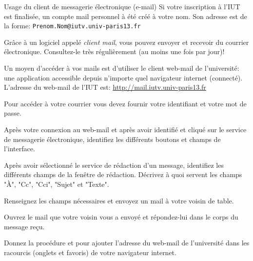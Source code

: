 \begin{exercice}
  \begin{exercicelet}{Usage du client de messagerie électronique
      (e-mail)}
    Si votre inscription à l'IUT est finalisée, un compte mail personnel
    à été créé à votre nom. Son adresse est de la forme:
    \texttt{Prenom.Nom@iutv.univ-paris13.fr}

    Grâce à un logiciel appelé \emph{client mail}, vous pouvez envoyer
    et recevoir du courrier électronique. Consultez-le très
    régulièrement (au moins une fois par jour)!

    Un moyen d'accéder à vos mails est d'utiliser le client web-mail de
    l'université: une application accessible depuis n'importe quel
    navigateur internet (connecté).  L'adresse du web-mail de l'IUT est:
    \url{http://mail.iutv.univ-paris13.fr}

    Pour accéder à votre courrier vous devez fournir votre identifiant
    et votre mot de passe.

    \begin{questions}
    \item Après votre connexion au web-mail et après avoir identifié et
      cliqué sur le service de messagerie électronique, identifiez les
      différents boutons et champs de l'interface.
    \item Après avoir sélectionné le service de rédaction d'un message,
      identifiez les différents champs de la fenêtre de
      rédaction. Décrivez à quoi servent les champs "À", "Cc", "Cci",
      "Sujet" et "Texte".
    \item Renseignez les champs nécessaires et envoyez un mail à votre
      voisin de table.
    \item Ouvrez le mail que votre voisin vous a envoyé et répondez-lui
      dans le corps du message reçu.
    \item Donnez la procédure et pour ajouter l'adresse du web-mail de
      l'université dans les racourcis (onglets et favoris) de votre
      navigateur internet.
    \end{questions}
  \end{exercicelet}
\end{exercice}
